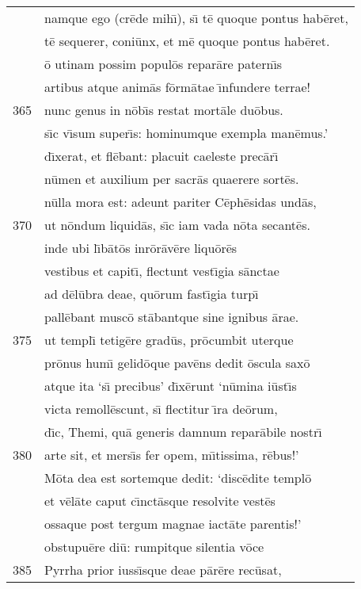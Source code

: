 \documentclass[paper=6in:9in,pagesize=pdftex,
               headinclude=on,footinclude=on,12pt]{scrbook}
\begin{document}
\begin{longtable}[p]{ r l }
 & namque ego (cr\=ede mih\={\i}), s\={\i} t\=e quoque pontus hab\=eret,\\ 
 & t\=e sequerer, coni\=unx, et m\=e quoque pontus hab\=eret.\\ 
 & \=o utinam possim popul\=os repar\=are patern\={\i}s\\ 
 & artibus atque anim\=as f\=orm\=atae \={\i}nfundere terrae!\\ 
365 & nunc genus in n\=ob\={\i}s restat mort\=ale du\=obus.\\ 
 & s\={\i}c v\={\i}sum super\={\i}s: hominumque exempla man\=emus.'\\ 
 & d\={\i}xerat, et fl\=ebant: placuit caeleste prec\=ar\={\i}\\ 
 & n\=umen et auxilium per sacr\=as quaerere sort\=es.\\ 
 & n\=ulla mora est: adeunt pariter C\=eph\=esidas und\=as,\\ 
370 & ut n\=ondum liquid\=as, s\={\i}c iam vada n\=ota secant\=es.\\ 
 & inde ubi l\={\i}b\=at\=os inr\=or\=av\=ere liqu\=or\=es\\ 
 & vestibus et capit\={\i}, flectunt vest\={\i}gia s\=anctae\\ 
 & ad d\=el\=ubra deae, qu\=orum fast\={\i}gia turp\={\i}\\ 
 & pall\=ebant musc\=o st\=abantque sine ignibus \=arae.\\ 
375 & ut templ\={\i} tetig\=ere grad\=us, pr\=ocumbit uterque\\ 
 & pr\=onus hum\={\i} gelid\=oque pav\=ens dedit \=oscula sax\=o\\ 
 & atque ita `s\={\i} precibus' d\={\i}x\=erunt `n\=umina i\=ust\={\i}s\\ 
 & victa remoll\=escunt, s\={\i} flectitur \={\i}ra de\=orum,\\ 
 & d\={\i}c, Themi, qu\=a generis damnum repar\=abile nostr\={\i}\\ 
380 & arte sit, et mers\={\i}s fer opem, m\={\i}tissima, r\=ebus!'\\ 
 & \indent M\=ota dea est sortemque dedit: `disc\=edite templ\=o\\ 
 & et v\=el\=ate caput c\={\i}nct\=asque resolvite vest\=es\\ 
 & ossaque post tergum magnae iact\=ate parentis!'\\ 
 & obstupu\=ere di\=u: rumpitque silentia v\=oce\\ 
385 & Pyrrha prior iuss\={\i}sque deae p\=ar\=ere rec\=usat,\\ 

\end{longtable}
\end{document}
